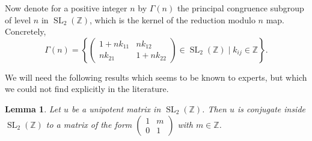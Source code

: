 \documentclass[a4paper,10pt]{amsart}
\newtheorem{lemma}{Lemma}[section]
\theoremstyle{definition}
\theoremstyle{remark}
\newcommand{\SL}{\operatorname{SL}}
\newcommand{\Z}{{\mathbb Z}}
\begin{document}
Now denote for a positive integer $n$ by $\Gamma(n)$ the principal congruence subgroup of level $n$ in $\SL_2(\Z)$, which is the kernel of the reduction modulo $n$ map. Concretely,
$$\Gamma(n) = \left\{ \begin{pmatrix}
1 +  n k_{11} & n k_{12} \\ n k_{21} & 1 + n k_{22}
\end{pmatrix} \in \SL_2(\Z) \mid k_{ij} \in \Z \right\}.$$

We will need the following results which seems to be known to experts, but which we could not find explicitly in the literature.

\begin{lemma}\label{unipotent conjugate}
Let $u$ be a unipotent matrix in $\SL_2(\Z)$. Then $u$ is conjugate inside $\SL_2(\Z)$ to a matrix of the form $\begin{pmatrix}
1 & m \\ 0 & 1
\end{pmatrix}$ with $m \in \Z$.
\end{lemma}
\end{document}
